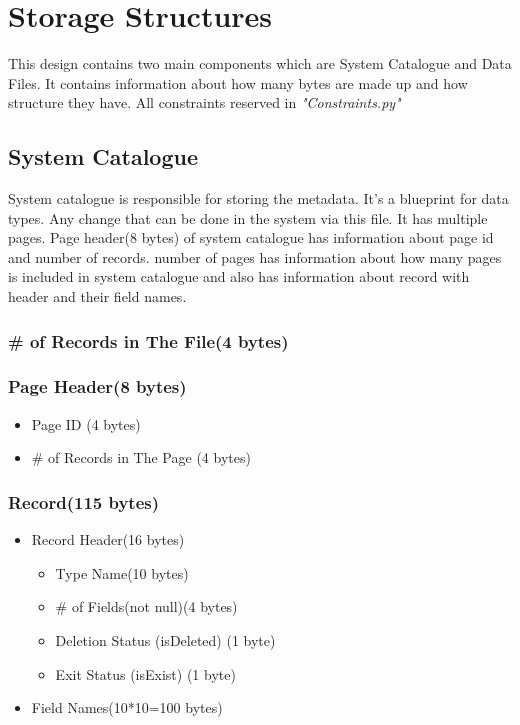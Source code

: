 \documentclass{article}
\begin{document}
\section{Storage Structures}
    This design contains two main components which are System Catalogue and Data Files. It contains information about how many bytes are made up and how structure they have. All constraints reserved in \emph{"Constraints.py"}
    \subsection{System Catalogue}
        System catalogue is responsible for storing the metadata. It's a blueprint for data types. Any change that can be done in the system via this file. It has multiple pages. Page header(8 bytes) of system catalogue has information about page id and number of records. number of pages has information about how many pages is included in system catalogue and also has information about record with header and their field names. 
        \subsubsection{\# of Records in The File(4 bytes)}
        \subsubsection{Page Header(8 bytes)}
            \begin{itemize}
                 \item Page ID (4 bytes)
                 \item \# of Records in The Page (4 bytes)
            \end{itemize}
        \subsubsection{Record(115 bytes)}
            \begin{itemize}
                 \item Record Header(16 bytes)
                    \begin{itemize}
                        \item Type Name(10 bytes)
                        \item \# of Fields(not null)(4 bytes)
                        \item Deletion Status (isDeleted) (1 byte)
                        \item Exit Status (isExist) (1 byte)
                    \end{itemize}
                 \item Field Names(10*10=100 bytes)
            \end{itemize}
\end{document}
